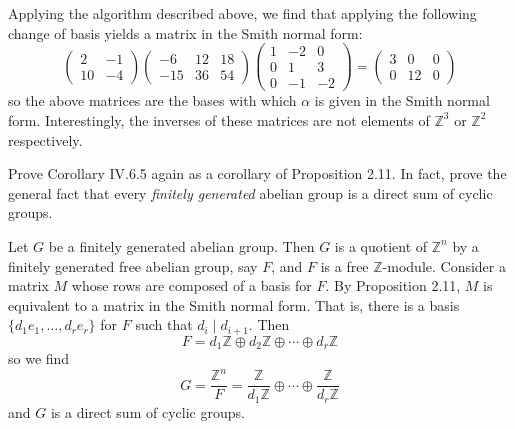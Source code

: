 \documentclass[../../master.tex]{subfiles}
\begin{document}
\begin{solution}
    Applying the algorithm described above, we find that applying the following change of basis yields a matrix in the Smith normal form:
    \[
    \begin{pmatrix}
        2 & -1 \\
        10 & -4
    \end{pmatrix}
    \begin{pmatrix}
        -6 & 12 & 18 \\
        -15 & 36 & 54
    \end{pmatrix}
    \begin{pmatrix}
        1 & -2 & 0 \\
        0 & 1 & 3 \\
        0 & -1 & -2
    \end{pmatrix} = 
    \begin{pmatrix}
        3 & 0 & 0 \\
        0 & 12 & 0
    \end{pmatrix}
    \]
    so the above matrices are the bases with which $\alpha$ is given in the Smith normal form.
    Interestingly, the inverses of these matrices are not elements of $\mathbb{Z}^3$ or $\mathbb{Z}^2$ respectively.
\end{solution}

\begin{problem}
    Prove Corollary IV.6.5 again as a corollary of Proposition 2.11.
    In fact, prove the general fact that every \textit{finitely generated} abelian group is a direct sum of cyclic groups.
\end{problem}

\begin{solution}
    Let $G$ be a finitely generated abelian group.
    Then $G$ is a quotient of $\mathbb{Z}^{n}$ by a finitely generated free abelian group, say $F$, and $F$ is a free $\mathbb{Z}$-module.
    Consider a matrix $M$ whose rows are composed of a basis for $F$.
    By Proposition 2.11, $M$ is equivalent to a matrix in the Smith normal form.
    That is, there is a basis $\{d_1 e_1, \ldots, d_r e_r\}$ for $F$ such that $d_i \mid d_{i+1}$.
    Then 
    \[
    F = d_1 \mathbb{Z} \oplus d_2 \mathbb{Z} \oplus \cdots \oplus d_r \mathbb{Z}
    \]
    so we find
    \[
    G = \frac{\mathbb{Z}^{n}}{F} = \frac{\mathbb{Z}}{d_1 \mathbb{Z}} \oplus \cdots \oplus \frac{\mathbb{Z}}{d_r \mathbb{Z}}
    \]
    and $G$ is a direct sum of cyclic groups.
\end{solution}
\end{document}
